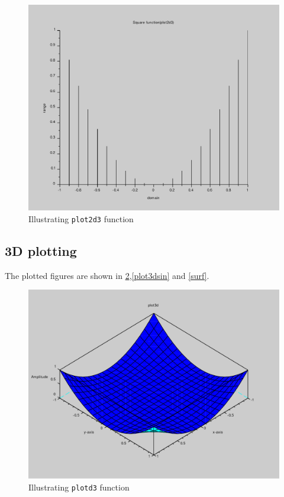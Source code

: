 \begin{figure}
\includegraphics[scale=.5]{scilabCode/plot2d3function.pdf}
\caption{Illustrating \texttt{plot2d3} function}
\label{plot2d3}
\end{figure}

\newpage

\subsection*{3D plotting}


The plotted figures are shown in \ref{plot3d},\ref{plot3dsin} and \ref{surf}.

\begin{figure}
\includegraphics[scale=.5]{scilabCode/plot3d.pdf}
\caption{Illustrating \texttt{plotd3} function}
\label{plot3d}
\end{figure}

